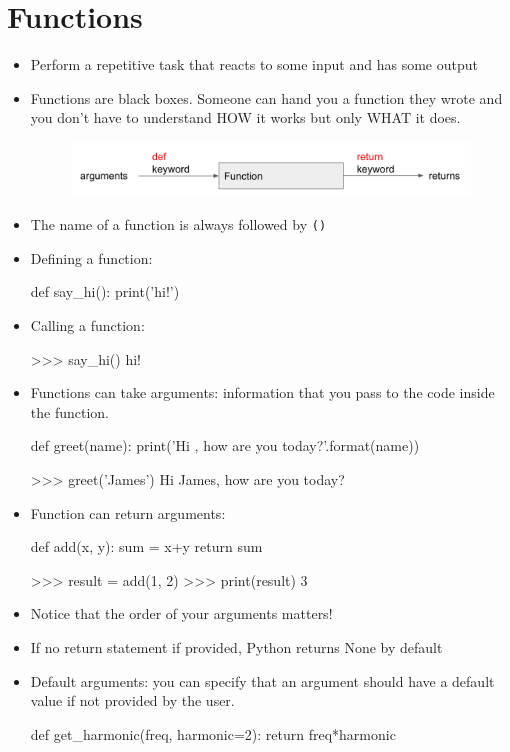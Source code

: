 \documentclass[12pt]{article}
\numberwithin{equation}{section}
\begin{document}
\section{Functions}
\begin{itemize}
    \item Perform a repetitive task that reacts to some input and has some output
    \item Functions are black boxes. Someone can hand you a function they wrote and you don't have to understand HOW it works but only WHAT it does.
    \begin{figure}[H]
	    \centering
	    \includegraphics[width=12cm] {box}
    \end{figure}
    \item The name of a function is always followed by \verb|()|
    \item Defining a function: 
    \begin{python}
    def say_hi():
        print('hi!')
    \end{python}
    \item Calling a function:
    \begin{python}
    >>> say_hi()
    hi!
    \end{python}
    \item Functions can take arguments: information that you pass to the code inside the function.
    \begin{python}
    def greet(name):
        print('Hi {}, how are you today?'.format(name))
        
    >>> greet('James')
	Hi James, how are you today?
    \end{python}
    \item Function can return arguments:
    \begin{python}
    def add(x, y):
        sum = x+y
        return sum
        
    >>> result = add(1, 2)
    >>> print(result)
    3
    \end{python}
    \item Notice that the order of your arguments matters!
    \item If no return statement if provided, Python returns None by default
    \item Default arguments: you can specify that an argument should have a default value if not provided by the user.
    \begin{python}
    def get_harmonic(freq, harmonic=2):
        return freq*harmonic
    

\end{python}
\end{itemize}
\end{document}
